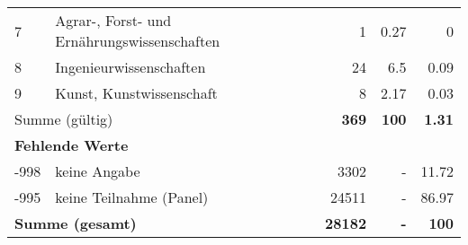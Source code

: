 \begin{longtable}{lXrrr}
     7 &
     \multicolumn{1}{X}{ Agrar-, Forst- und Ernährungswissenschaften   } &


       \num{1} &
       \num[round-mode=places,round-precision=2]{0.27} &
         \num[round-mode=places,round-precision=2]{0} \\

     8 &
     \multicolumn{1}{X}{ Ingenieurwissenschaften   } &


       \num{24} &
       \num[round-mode=places,round-precision=2]{6.5} &
         \num[round-mode=places,round-precision=2]{0.09} \\

     9 &
     \multicolumn{1}{X}{ Kunst, Kunstwissenschaft   } &


       \num{8} &
       \num[round-mode=places,round-precision=2]{2.17} &
         \num[round-mode=places,round-precision=2]{0.03} \\
     \midrule
     \multicolumn{2}{l}{Summe (gültig)} &
       \textbf{\num{369}} &
     \textbf{100} &
       \textbf{\num[round-mode=places,round-precision=2]{1.31}} \\
     \multicolumn{5}{l}{\textbf{Fehlende Werte}}\\
       -998 &
       keine Angabe &
         \num{3302} &
        - &
         \num[round-mode=places,round-precision=2]{11.72} \\
       -995 &
       keine Teilnahme (Panel) &
         \num{24511} &
        - &
         \num[round-mode=places,round-precision=2]{86.97} \\
     \midrule
     \multicolumn{2}{l}{\textbf{Summe (gesamt)}} &
          \textbf{\num{28182}} &
        \textbf{-} &
        \textbf{100} \\
     \bottomrule
     \end{longtable}
     
